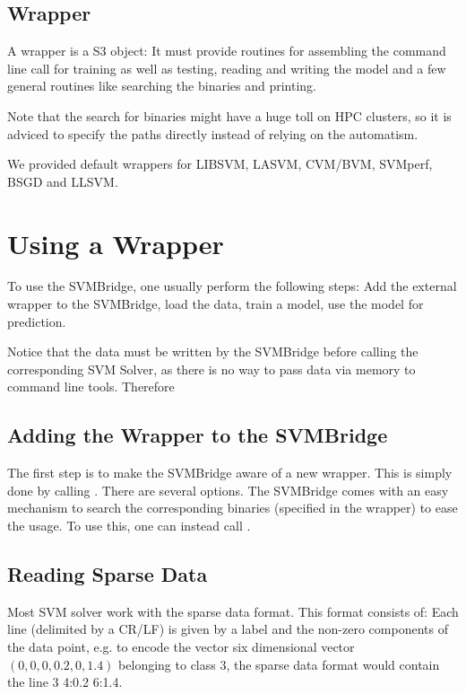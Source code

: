 \documentclass[article, shortnames]{jss}
\begin{document}
\subsection{Wrapper}

A wrapper is a S3 object: It must provide routines
for assembling the command line call for training as well as testing,
reading and writing the model and a few general routines like searching
the binaries and printing.

Note that the search for binaries might have a huge toll on HPC clusters,
so it is adviced to specify the paths directly instead of relying on the 
automatism.

We provided default wrappers for LIBSVM, LASVM, CVM/BVM,
SVMperf, BSGD and LLSVM. 



\section{Using a Wrapper}

To use the SVMBridge, one usually perform the following steps:
Add the external wrapper to the SVMBridge, load the data, train a model, use the
model for prediction.

Notice that the data must be written by the SVMBridge before calling 
the corresponding SVM Solver, as there is no way to pass data via memory
to command line tools. Therefore 


\subsection{Adding the Wrapper to the SVMBridge}

The first step is to make the SVMBridge aware of a new wrapper.
This is simply done by calling .
There are several options.
The SVMBridge comes with an easy mechanism to search 
the corresponding binaries (specified in the wrapper) to ease
the usage. To use this, one can instead call .



\subsection{Reading Sparse Data}

Most SVM solver work with the sparse data format.
This format consists of:
Each line (delimited by a CR/LF) is given by a label
and the non-zero components of the data point,
e.g. to encode the vector six dimensional vector 
 $ ( 0 , 0 , 0 , 0.2 , 0 , 1.4 ) $
belonging to class $3$, the sparse 
data format would contain the line {3 4:0.2 6:1.4}.
\end{document}
